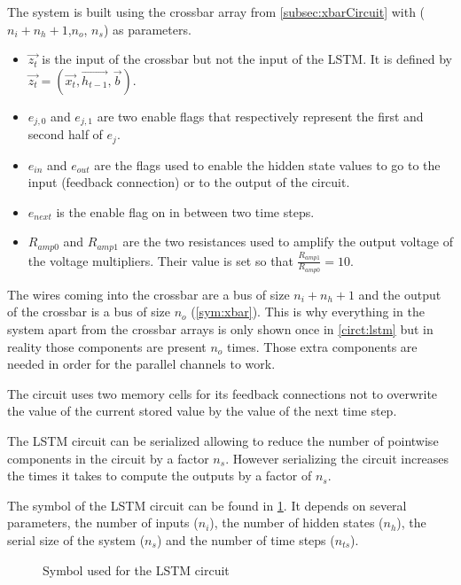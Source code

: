 The system is built using the crossbar array from \cref{subsec:xbarCircuit} with ($n_i+n_h+1$,$n_o$, $n_s$) as parameters.

\begin{itemize}
  \item $\overrightarrow{z_t}$ is the input of the crossbar but not the input of the \ac{LSTM}. It is defined by $\overrightarrow{z_t}=(\overrightarrow{x_t},\overrightarrow{h_{t-1}},\overrightarrow{b})$.
  \item $e_{j,0}$ and $e_{j,1}$ are two enable flags that respectively represent the first and second half of $e_j$.
  \item $e_{in}$ and $e_{out}$ are the flags used to enable the hidden state values to go to the input (feedback connection) or to the output of the circuit.
  \item $e_{next}$ is the enable flag on in between two time steps.
  \item $R_{amp0}$ and $R_{amp1}$ are the two resistances used to amplify the output voltage of the voltage multipliers. Their value is set so that $\frac{R_{amp1}}{R_{amp0}}=10$.
\end{itemize}

The wires coming into the crossbar are a bus of size $n_i+n_h+1$ and the output of the crossbar is a bus of size $n_o$ (\cref{sym:xbar}). This is why everything in the system apart from the crossbar arrays is only shown once in \cref{circt:lstm} but in reality those components are present $n_o$ times. Those extra components are needed in order for the parallel channels to work.

The circuit uses two memory cells for its feedback connections not to overwrite the value of the current stored value by the value of the next time step.

The LSTM circuit can be serialized allowing to reduce the number of pointwise components in the circuit by a factor $n_s$. However serializing the circuit increases the times it takes to compute the outputs by a factor of $n_s$.

The symbol of the \ac{LSTM} circuit can be found in \cref{sym:lstm}. It depends on several parameters, the number of inputs ($n_i$), the number of hidden states ($n_h$), the serial size of the system ($n_s$) and the number of time steps ($n_{ts}$).

\begin{figure}[b]
  \centering
  
  \caption{Symbol used for the \ac{LSTM} circuit}
  \label{sym:lstm}
\end{figure}

